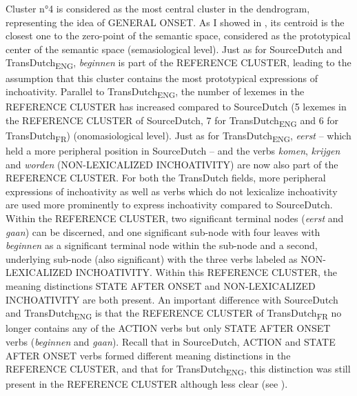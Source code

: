 Cluster n°4 is considered as the most central cluster in the dendrogram, representing the idea of GENERAL ONSET. As I showed in , its centroid is the closest one to the zero-point of the semantic space, considered as the prototypical center of the semantic space (semasiological level). Just as for SourceDutch and TransDutch\textsubscript{ENG}, \textit{beginnen} is part of the REFERENCE CLUSTER, leading to the assumption that this cluster contains the most prototypical expressions of inchoativity. Parallel to TransDutch\textsubscript{ENG}, the number of lexemes in the REFERENCE CLUSTER has increased compared to SourceDutch (5 lexemes in the REFERENCE CLUSTER of SourceDutch, 7 for TransDutch\textsubscript{ENG} and 6 for TransDutch\textsubscript{FR}) (onomasiological level). Just as for TransDutch\textsubscript{ENG}, \textit{eerst} – which held a more peripheral position in SourceDutch – and the verbs \textit{komen}, \textit{krijgen} and \textit{worden} ({NON-LEXICALIZED INCHOATIVITY}) are now also part of the REFERENCE CLUSTER. For both the TransDutch fields, more peripheral expressions of inchoativity as well as verbs which do not lexicalize inchoativity are used more prominently to express inchoativity compared to SourceDutch. Within the REFERENCE CLUSTER, two significant terminal nodes (\textit{eerst} and \textit{gaan}) can be discerned, and one significant sub-node with four leaves with \textit{beginnen} as a significant terminal node within the sub-node and a second, underlying sub-node (also significant) with the three verbs labeled as {NON-LEXICALIZED INCHOATIVITY}. Within this REFERENCE CLUSTER, the meaning distinctions STATE AFTER ONSET and {NON-LEXICALIZED INCHOATIVITY} are both present. An important difference with SourceDutch and TransDutch\textsubscript{ENG} is that the REFERENCE CLUSTER of TransDutch\textsubscript{FR} no longer contains any of the ACTION verbs but only STATE AFTER ONSET verbs (\textit{beginnen} and \textit{gaan}). Recall that in SourceDutch, ACTION and STATE AFTER ONSET verbs formed different meaning distinctions in the REFERENCE CLUSTER, and that for TransDutch\textsubscript{ENG}, this distinction was still present in the REFERENCE CLUSTER although less clear (see ).

